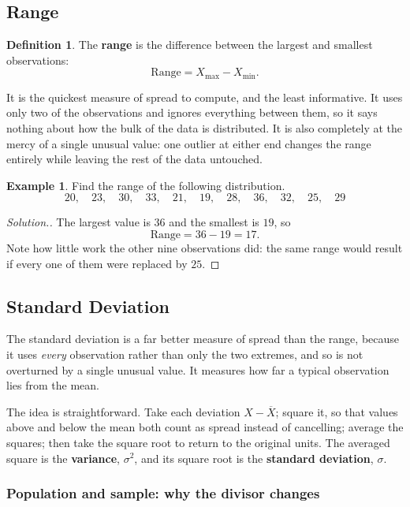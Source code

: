 \documentclass[11pt,a4paper]{article}
\theoremstyle{definition}
\newtheorem{definition}[thm]{Definition}
\newtheorem{example}[thm]{Example}
\newenvironment{solution}
  {\renewcommand{\qedsymbol}{}\begin{proof}[\textit{Solution}.]}
  {\end{proof}}
\begin{document}
\subsection{Range}

\begin{definition}
The \textbf{range} is the difference between the largest and smallest observations:
\[\text{Range}=X_{\max}-X_{\min}.\]
\end{definition}

It is the quickest measure of spread to compute, and the least informative. It uses only
two of the observations and ignores everything between them, so it says nothing about how
the bulk of the data is distributed. It is also completely at the mercy of a single unusual
value: one outlier at either end changes the range entirely while leaving the rest of the
data untouched.

\begin{example}
Find the range of the following distribution.
\[20,\quad 23,\quad 30,\quad 33,\quad 21,\quad 19,\quad 28,\quad 36,\quad 32,\quad 25,\quad 29\]
\end{example}

\begin{solution}
The largest value is $36$ and the smallest is $19$, so
\[\text{Range}=36-19=17.\]
Note how little work the other nine observations did: the same range would result if every
one of them were replaced by $25$.
\end{solution}

\subsection{Standard Deviation}

The standard deviation is a far better measure of spread than the range, because it uses
\emph{every} observation rather than only the two extremes, and so is not overturned by a
single unusual value. It measures how far a typical observation lies from the mean.

The idea is straightforward. Take each deviation $X-\overline{X}$; square it, so that
values above and below the mean both count as spread instead of cancelling; average the
squares; then take the square root to return to the original units. The averaged square is
the \textbf{variance}, $\sigma^2$, and its square root is the \textbf{standard deviation},
$\sigma$.

\subsubsection{Population and sample: why the divisor changes}
\end{document}
